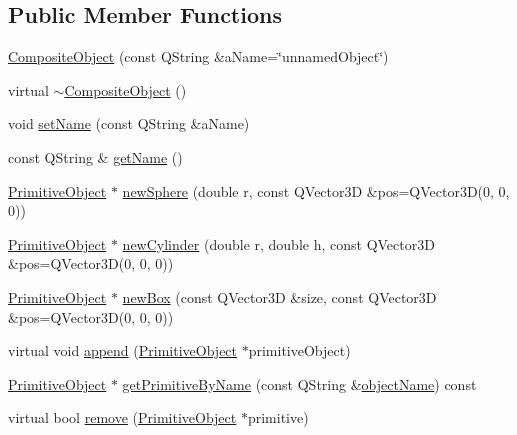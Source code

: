 \subsection*{Public Member Functions}
\begin{DoxyCompactItemize}
\item 
\hyperlink{class_robot_model_1_1_composite_object_a28feebceeaeec6c4d4ec6adc9fc52d90}{CompositeObject} (const QString \&aName=\char`\"{}unnamedObject\char`\"{})
\item 
virtual \hyperlink{class_robot_model_1_1_composite_object_a52c02078b1e3e9f4f436874fb044a27b}{$\sim$CompositeObject} ()
\item 
void \hyperlink{class_robot_model_1_1_composite_object_a02a2c1ee58297a6ea0131fa808498a49}{setName} (const QString \&aName)
\item 
const QString \& \hyperlink{class_robot_model_1_1_composite_object_a893e71523b76afc186796fc95ead70d7}{getName} ()
\item 
\hyperlink{class_robot_model_1_1_primitive_object}{PrimitiveObject} $\ast$ \hyperlink{class_robot_model_1_1_composite_object_aa5b61818415089630ee37a3767b5c37c}{newSphere} (double r, const QVector3D \&pos=QVector3D(0, 0, 0))
\item 
\hyperlink{class_robot_model_1_1_primitive_object}{PrimitiveObject} $\ast$ \hyperlink{class_robot_model_1_1_composite_object_a196a2811a85c1313f781b140f2ab313e}{newCylinder} (double r, double h, const QVector3D \&pos=QVector3D(0, 0, 0))
\item 
\hyperlink{class_robot_model_1_1_primitive_object}{PrimitiveObject} $\ast$ \hyperlink{class_robot_model_1_1_composite_object_a869235cebecc6802b9c63ce7e2359ddb}{newBox} (const QVector3D \&size, const QVector3D \&pos=QVector3D(0, 0, 0))
\item 
virtual void \hyperlink{class_robot_model_1_1_composite_object_ad33452f1246939d366ffbf02d1022a91}{append} (\hyperlink{class_robot_model_1_1_primitive_object}{PrimitiveObject} $\ast$primitiveObject)
\item 
\hyperlink{class_robot_model_1_1_primitive_object}{PrimitiveObject} $\ast$ \hyperlink{class_robot_model_1_1_composite_object_ad02b7a8e84453fb433d5efaac80333c9}{getPrimitiveByName} (const QString \&\hyperlink{class_robot_model_1_1_composite_object_a4e833bb302d4a1a791211261251eff68}{objectName}) const 
\item 
virtual bool \hyperlink{class_robot_model_1_1_composite_object_ac63de1955b6bda820d39c01616af8665}{remove} (\hyperlink{class_robot_model_1_1_primitive_object}{PrimitiveObject} $\ast$primitive)

\end{DoxyCompactItemize}
